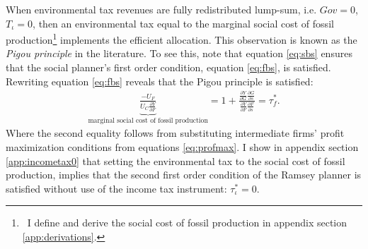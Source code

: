 When environmental tax revenues are fully redistributed lump-sum, i.e. $Gov=0$, $T_\iota=0$, then an environmental tax equal to the marginal social cost of fossil production\footnote{\ I define and derive the social cost of fossil production in appendix section \ref{app:derivations}.} implements the efficient allocation. This observation is known as the \textit{Pigou principle} in the literature. 
To see this, note that equation \ref{eq:sbs} ensures that the social planner's first order condition, equation \ref{eq:fbs}, is satisfied. 
Rewriting equation \ref{eq:fbs} reveals that the Pigou principle is satisfied: %
\begin{align}
\underbrace{\frac{-U_F}{U_C\frac{\partial Y}{\partial F}}}_{\text{marginal social cost of fossil production}}=1+\frac{\frac{\partial Y}{\partial G}\frac{\partial G}{\partial s}}{\frac{\partial Y}{\partial F}\frac{\partial F}{\partial s}}=\tau^*_f.
\end{align}
Where the second equality follows from substituting intermediate firms' profit maximization conditions from equations \ref{eq:profmax}. I show in appendix section \ref{app:incometax0} that setting the environmental tax to the social cost of fossil production, implies that the second first order condition of the Ramsey planner is satisfied without use of the income tax instrument: $\tau_{\iota}^*=0$. %

